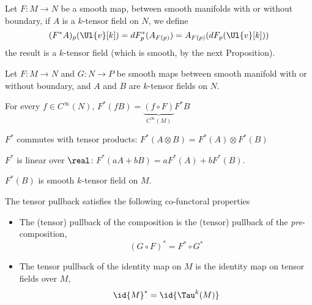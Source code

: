 \documentclass[../main-v2-manifolds.tex]{subfiles}
\begin{document}
\begin{definition}
    Let $F: M\to N$ be a smooth map, between smooth manifolds with or without boundary, if $A$ is a $k$-tensor field on $N$, we define 
    \begin{equation}\label{tensor-field-pullback-eq}
        (F^*A)_p(\Ul{v}[k]) = dF^*_p(A_{F(p)}) = A_{F(p)}(dF_p(\Ul{v}[k]))
    \end{equation}
    the result is a $k$-tensor field (which is smooth, by the next Proposition).
\end{definition}

\begin{wts}
    Let $F: M\to N$ and $G:N\to P$ be smooth maps between smooth manifold with or without boundary, and $A$ and $B$ are $k$-tensor fields on $N$.
    \begin{enumroman}
        \item For every $f\in C^\infty(N)$, $F^*(fB) = \underbrace{(f\circ F)}_{C^\infty(M)}F^*B$
        \item $F^*$ commutes with tensor products: $F^*(A\otimes B) = F^*(A)\otimes F^*(B)$
        \item $F^*$ is linear over $\real$: $F^*(aA + bB) = aF^*(A) + bF^*(B)$.
        \item $F^*(B)$ is smooth $k$-tensor field on $M$.
        \item The tensor pullback satisfies the following co-functoral properties
        \begin{itemize}
            \item The (tensor) pullback of the composition is the (tensor) pullback of the \emph{pre}-composition,
            \[
                (G\circ F)^* = F^*\circ G^*
            \]
            \item The tensor pullback of the identity map on $M$ is the identity map on tensor fields over $M$,
            \[
                \id{M}^* =\id{\Tau^k(M)}
            \]
        \end{itemize}
    \end{enumroman}
\end{wts}
\end{document}
